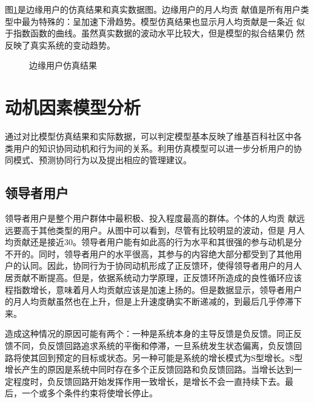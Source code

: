 图\ref{fig:simu5}是边缘用户的仿真结果和真实数据图。边缘用户的月人均贡
献值是所有用户类型中最为特殊的：呈加速下滑趋势。模型仿真结果也显示月人均贡献是一条近
似于指数函数的曲线。虽然真实数据的波动水平比较大，但是模型的拟合结果仍
然反映了真实系统的变动趋势。
\begin{figure}[!htb]
  \centering
  \caption{\small{边缘用户仿真结果}}
  \label{fig:simu5}
\end{figure}

\section{动机因素模型分析}
通过对比模型仿真结果和实际数据，可以判定模型基本反映了维基百科社区中各
类用户的知识协同动机和行为间的关系。利用仿真模型可以进一步分析用户的协
同模式、预测协同行为以及提出相应的管理建议。

\subsection{领导者用户}

领导者用户是整个用户群体中最积极、投入程度最高的群体。个体的人均贡
献远远要高于其他类型的用户。从图中可以看到，尽管有比较明显的波动，但是
月人均贡献还是接近30。领导者用户能有如此高的行为水平和其很强的参与动机是分
不开的。同时，领导者用户的水平很高，其参与的内容绝大部分都受到了其他用
户的认同。因此，协同行为于协同动机形成了正反馈环，使得领导者用户的月人
居贡献不断提高。但是，依据系统动力学原理，正反馈环所造成的良性循环应该
程指数增长，意味着月人均贡献应该是加速上扬的。但是数据显示，领导者用户
的月人均贡献虽然也在上升，但是上升速度确实不断递减的，到最后几乎停滞下
来。

造成这种情况的原因可能有两个：一种是系统本身的主导反馈是负反馈。同正反
馈不同，负反馈回路追求系统的平衡和停滞，一旦系统发生状态偏离，负反馈回
路将使其回到预定的目标或状态。另一种可能是系统的增长模式为S型增长。S型
增长产生的原因是系统中同时存在多个正反馈回路和负反馈回路。当增长达到一
定程度时，负反馈回路开始发挥作用一致增长，是增长不会一直持续下去。最
后，一个或多个条件约束将使增长停止。

